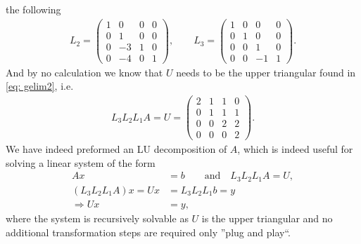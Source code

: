 the following
\begin{align}
    L_2 =
     \begin{pmatrix}
         1 & 0 & 0 & 0\\
         0 & 1 & 0 & 0\\
         0 & -3 & 1 & 0\\
         0 & -4 & 0 & 1
     \end{pmatrix}, \qquad
     L_3 =
     \begin{pmatrix}
         1 & 0 & 0 & 0\\
         0 & 1 & 0 & 0\\
         0 & 0 & 1 & 0\\
         0 & 0 & -1 & 1
     \end{pmatrix}.
\end{align}
And by no calculation we know that $U$ needs to be the upper triangular
found in \ref{eq: gelim2}, i.e.
\begin{align}
    L_3L_2L_1A = U =
    \begin{pmatrix}
        2 & 1 & 1 & 0 \\
        0 & 1 & 1 & 1 \\
        0 & 0 & 2 & 2 \\
        0 & 0 & 0 & 2
    \end{pmatrix}.
\end{align}
We have indeed preformed an LU decomposition of $A$, which is indeed
useful for solving a linear system of the form
\begin{align}
    A x &= b \qquad \text{and} \quad L_3L_2L_1A = U,\\
    (L_3L_2L_1A)x = Ux &= L_3L_2L_1b = y\\
    \Rightarrow Ux &= y,
\end{align}
where the system is recursively solvable as $U$ is the upper triangular
and no additional transformation steps are required only ''plug and
play``.
